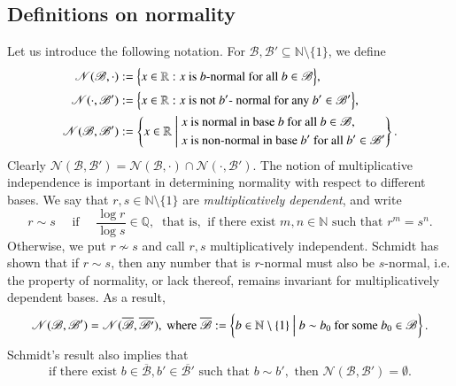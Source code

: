 \documentclass[12pt, twoside]{article}
\theoremstyle{definition}
\numberwithin{equation}{section}
\begin{document}
\subsection{Definitions on normality} 
Let us introduce the following notation. For $\mathscr{B}, \mathscr{B}' \subseteq \mathbb N \setminus \{1\}$, we define 
\begin{align}  
\mathscr N(\mathscr B, \cdot) &:=  \Bigl\{x \in \mathbb R: x \text{ is $b$-normal for all } b \in \mathscr B \Bigr\}, \label{N1} \\  
\mathscr N(\cdot, \mathscr B') &:=  \Bigl\{x \in \mathbb R: x \text{ is not $b'$- normal for any } b' \in \mathscr B' \Bigr\}, \label{N2}  \\
\mathscr N(\mathscr B, \mathscr B') &:= \left\{x \in \mathbb R \; \Biggl| \;  \begin{aligned} &x \text{ is normal in base } b \text{ for all } b \in \mathscr B, \\  &x \text{ is non-normal in base } b' \text{ for all } b' \in \mathscr B' \end{aligned}  \right\}. \label{N3} 
\end{align}  
Clearly $\mathscr N(\mathscr B, \mathscr B') = \mathscr N(\mathscr B, \cdot) \cap \mathscr N(\cdot, \mathscr B')$. 
\vskip0.1in 
\noindent The notion of multiplicative independence is important in determining normality with respect to different bases. We say that $r, s \in \mathbb N \setminus \{1\}$ are {\em{multiplicatively dependent}}, and write 
\begin{equation} \label{def-mult-dep} r \sim s \quad \text{ if } \quad \frac{\log r}{\log s} \in \mathbb Q, \; \; \text{that is,} \; \; \text{if there exist $m, n \in \mathbb N$ such that } r^m = s^n.  \end{equation}    
Otherwise, we put $r \not\sim s$ and call $r, s$ multiplicatively independent. Schmidt \cite[Theorem 1]{s60} has shown that if $r \sim s$, then any number that is $r$-normal must also be $s$-normal, i.e. the property of normality, or lack thereof, remains invariant for multiplicatively dependent bases. As a result,  
\begin{equation*} 
\mathscr N(\mathscr{B}, \mathscr{B}') = \mathscr N(\overline{\mathscr{B}}, \overline{\mathscr{B}'}), \text{ where } 
\overline{\mathscr{B}} := \left\{b \in \mathbb N \setminus \{1\} \; \Bigl| \; b \sim b_0 \text{ for some } b_0 \in \mathscr{B} \right\}. 
\end{equation*}
Schmidt's result also implies that 
\[ \text{if there exist } b \in \overline{\mathscr{B}}, b' \in \overline{\mathscr{B}'} \text{ such that } b \sim b', \text{ then } \mathscr N(\mathscr{B}, \mathscr{B}') = \emptyset. \] 
\end{document}
